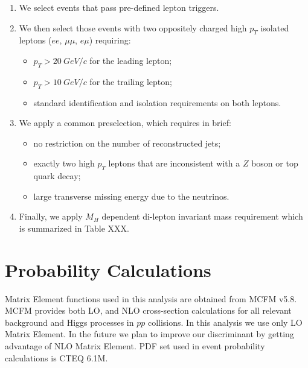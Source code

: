 \documentclass{cmspaper}
\begin{document}
\begin{enumerate}                                                                                                     
\item We select events that pass pre-defined lepton triggers.                                                                 
\item We then select those events with two oppositely charged high $p_{T}$ isolated leptons ($ee$, $\mu\mu$, $e\mu$) requiring:
\begin{itemize}
   \item $p_{T}>20~GeV/c$ for the leading lepton;                                                                        
   \item $p_{T}>10~GeV/c$ for the trailing lepton;                                                                            
   \item standard identification and isolation requirements on both leptons.                                                  
\end{itemize}                                                                                                                  
\item 
We apply a common preselection, which requires in brief:                                                           
\begin{itemize}                                                                                                                
\item no restriction on the number of reconstructed jets;                                                                      
\item exactly two high $p_{T}$ leptons that are inconsistent with a $Z$ boson or top quark decay;              
\item large transverse missing energy due to the neutrinos.
\end{itemize}                                                                                                                  

\item Finally, we apply $M_{H}$ dependent di-lepton invariant mass requirement which is
summarized in Table XXX.                                                                                               
\end{enumerate}             

\section{ Probability Calculations }
Matrix Element functions used in this analysis are obtained from  MCFM v5.8.  
MCFM provides both LO, and NLO cross-section calculations for 
all relevant background and Higgs processes in $pp$ collisions. In this analysis 
we use only LO Matrix Element. In the future we plan to improve our discriminant 
by getting advantage of NLO Matrix Element. PDF set used in event probability 
calculations is CTEQ 6.1M.
\end{document}
